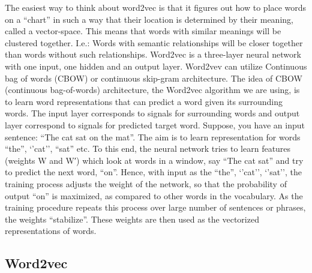 \documentclass[11pt]{article}
\begin{document}
The easiest way to think about word2vec is that it figures out how to
place words on a ``chart'' in such a way that their location is
determined by their meaning, called a vector-space. This means that
words with similar meanings will be clustered together. I.e.: Words with
semantic relationships will be closer together than words without such
relationships. Word2vec is a three-layer neural network with one input,
one hidden and an output layer. Word2vev can utilize Continuous bag of
words (CBOW) or continuous skip-gram architecture. The idea of CBOW
(continuous bag-of-words) architecture, the Word2vec algorithm we are
using, is to learn word representations that can predict a word given
its surrounding words. The input layer corresponds to signals for
surrounding words and output layer correspond to signals for predicted
target word. Suppose, you have an input sentence: ``The cat sat on the
mat''. The aim is to learn representation for words ``the'', `'cat'',
``sat'' etc. To this end, the neural network tries to learn features
(weights W and W′) which look at words in a window, say ``The cat sat''
and try to predict the next word, ``on''. Hence, with input as the
``the'', `'cat'', `'sat'', the training process adjusts the weight of
the network, so that the probability of output ``on'' is maximized, as
compared to other words in the vocabulary. As the training procedure
repeats this process over large number of sentences or phrases, the
weights ``stabilize''. These weights are then used as the vectorized
representations of words.

\hypertarget{word2vec-1}{%
\subsection{Word2vec}\label{word2vec-1}}
\end{document}
